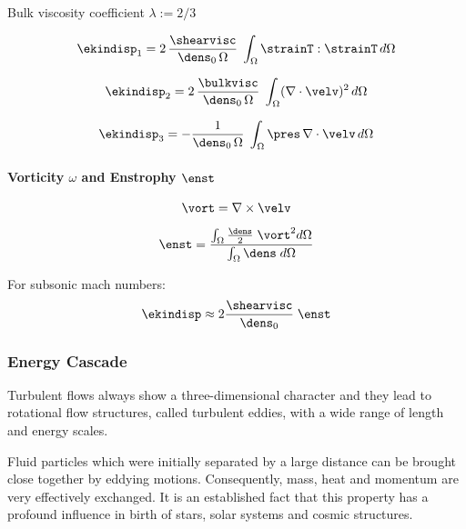 Bulk viscosity coefficient $\lambda := 2/3$

\begin{equation}
\label{eq:ekindisp1}
    \ekindisp_1 = 2\,\frac{\shearvisc}{\dens_0\,\Omega} \; \int_\Omega \strainT : \strainT \, d\Omega
\end{equation}

\begin{equation}
\label{eq:ekindisp2}
    \ekindisp_2 = 2\,\frac{\bulkvisc}{\dens_0\,\Omega} \; \int_\Omega (\nabla \cdot \velv)^2 \, d\Omega
\end{equation}

\begin{equation}
\label{eq:ekindisp3}
    \ekindisp_3 = -\frac{1}{\dens_0\,\Omega} \; \int_\Omega \pres \, \nabla \cdot \velv \, d\Omega
\end{equation}

\paragraph{Vorticity $\omega$ and Enstrophy $\enst$}

\begin{equation}
\label{eq:vort}
    \vort = \nabla \times \velv
\end{equation}

\begin{equation}
\label{eq:enst}
    \enst = \frac{\int_\Omega \frac{\dens}{2} \; \vort^2 d\Omega}{\int_\Omega \dens \; d\Omega}
\end{equation}

For subsonic mach numbers:
\begin{equation}
\label{eq:ekindisp2}
    \ekindisp \approx 2 \frac{\shearvisc}{\dens_0} \; \enst
\end{equation}

\subsubsection{Energy Cascade}

Turbulent flows always show a three-dimensional character and they lead to
rotational flow structures, called turbulent eddies, with a wide range of
length and energy scales.

Fluid particles which were initially separated by a large distance can be
brought close together by eddying motions. Consequently, mass, heat and momentum
are very effectively exchanged. It is an established fact that this
property has a profound influence in birth of stars, solar systems and cosmic
structures.

